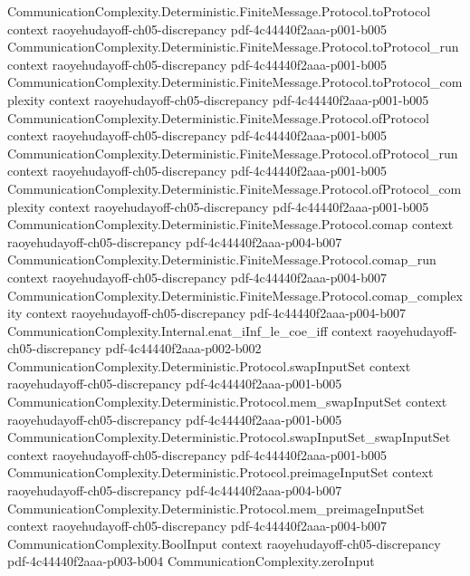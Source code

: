 \begin{lemma}
\proofstep
  {CommunicationComplexity.Deterministic.FiniteMessage.Protocol.toProtocol}
  {context}
  {raoyehudayoff-ch05-discrepancy}
  {pdf-4c44440f2aaa-p001-b005}
\proofstep
  {CommunicationComplexity.Deterministic.FiniteMessage.Protocol.toProtocol_run}
  {context}
  {raoyehudayoff-ch05-discrepancy}
  {pdf-4c44440f2aaa-p001-b005}
\proofstep
  {CommunicationComplexity.Deterministic.FiniteMessage.Protocol.toProtocol_complexity}
  {context}
  {raoyehudayoff-ch05-discrepancy}
  {pdf-4c44440f2aaa-p001-b005}
\proofstep
  {CommunicationComplexity.Deterministic.FiniteMessage.Protocol.ofProtocol}
  {context}
  {raoyehudayoff-ch05-discrepancy}
  {pdf-4c44440f2aaa-p001-b005}
\proofstep
  {CommunicationComplexity.Deterministic.FiniteMessage.Protocol.ofProtocol_run}
  {context}
  {raoyehudayoff-ch05-discrepancy}
  {pdf-4c44440f2aaa-p001-b005}
\proofstep
  {CommunicationComplexity.Deterministic.FiniteMessage.Protocol.ofProtocol_complexity}
  {context}
  {raoyehudayoff-ch05-discrepancy}
  {pdf-4c44440f2aaa-p001-b005}
\proofstep
  {CommunicationComplexity.Deterministic.FiniteMessage.Protocol.comap}
  {context}
  {raoyehudayoff-ch05-discrepancy}
  {pdf-4c44440f2aaa-p004-b007}
\proofstep
  {CommunicationComplexity.Deterministic.FiniteMessage.Protocol.comap_run}
  {context}
  {raoyehudayoff-ch05-discrepancy}
  {pdf-4c44440f2aaa-p004-b007}
\proofstep
  {CommunicationComplexity.Deterministic.FiniteMessage.Protocol.comap_complexity}
  {context}
  {raoyehudayoff-ch05-discrepancy}
  {pdf-4c44440f2aaa-p004-b007}
\proofstep
  {CommunicationComplexity.Internal.enat_iInf_le_coe_iff}
  {context}
  {raoyehudayoff-ch05-discrepancy}
  {pdf-4c44440f2aaa-p002-b002}
\proofstep
  {CommunicationComplexity.Deterministic.Protocol.swapInputSet}
  {context}
  {raoyehudayoff-ch05-discrepancy}
  {pdf-4c44440f2aaa-p001-b005}
\proofstep
  {CommunicationComplexity.Deterministic.Protocol.mem_swapInputSet}
  {context}
  {raoyehudayoff-ch05-discrepancy}
  {pdf-4c44440f2aaa-p001-b005}
\proofstep
  {CommunicationComplexity.Deterministic.Protocol.swapInputSet_swapInputSet}
  {context}
  {raoyehudayoff-ch05-discrepancy}
  {pdf-4c44440f2aaa-p001-b005}
\proofstep
  {CommunicationComplexity.Deterministic.Protocol.preimageInputSet}
  {context}
  {raoyehudayoff-ch05-discrepancy}
  {pdf-4c44440f2aaa-p004-b007}
\proofstep
  {CommunicationComplexity.Deterministic.Protocol.mem_preimageInputSet}
  {context}
  {raoyehudayoff-ch05-discrepancy}
  {pdf-4c44440f2aaa-p004-b007}
\proofstep
  {CommunicationComplexity.BoolInput}
  {context}
  {raoyehudayoff-ch05-discrepancy}
  {pdf-4c44440f2aaa-p003-b004}
\proofstep
  {CommunicationComplexity.zeroInput}

\end{lemma}
